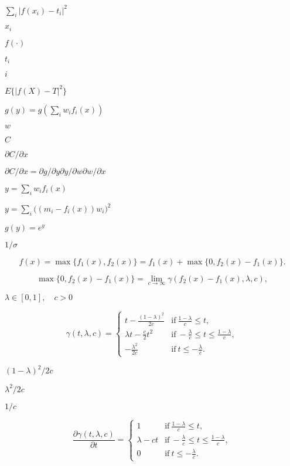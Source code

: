 \documentclass{article}
\begin{document}
$\sum_i |f(x_i)-t_i|^2$
\pagebreak

$x_i$
\pagebreak

$f(\cdot)$
\pagebreak

$t_i$
\pagebreak

$i$
\pagebreak

$E\{|f(X)-T|^2\}$
\pagebreak

$g(y) =g(\sum_i w_i f_i (x))$
\pagebreak

$w$
\pagebreak

$C$
\pagebreak

$\partial C/\partial x$
\pagebreak

$\partial C/\partial x = \partial g/\partial y \partial y/\partial w \partial w/\partial x$
\pagebreak

$y = \sum_i w_i f_i (x)$
\pagebreak

$y = \sum_i \big((m_i-f_i(x)) w_i\big)^2$
\pagebreak

$g(y) = e^y$
\pagebreak

$1/\sigma$
\pagebreak

\[ f(x) = \max \{f_1(x), f_2(x)\} = f_1(x) + \max \{0, f_2(x) - f_1(x)\}. \]
\pagebreak

\[ \max \{0, f_2(x) - f_1(x)\} = \lim_{c \rightarrow \infty} \gamma(f_2(x)-f_1(x), \lambda, c), \]
\pagebreak

$\lambda \in [0,1], \quad c>0$
\pagebreak

\[ \gamma(t,\lambda,c) = \begin{cases} t - \frac{(1-\lambda)^2}{2c} & \textrm{if}~ \frac{1-\lambda}{c} \leq t,\\ \lambda t - \frac{c}{2} t^2 & \textrm{if}~ -\frac{\lambda}{c} \leq t \leq \frac{1-\lambda}{c},\\ -\frac{\lambda^2}{2c} & \text{if}~ t \leq -\frac{\lambda}{c}. \end{cases} \]
\pagebreak

$(1-\lambda)^2/2c$
\pagebreak

$\lambda^2/2c$
\pagebreak

$1/c$
\pagebreak

\[ \frac{\partial \gamma(t,\lambda,c)}{\partial t} = \begin{cases} 1 & \textrm{if}~ \frac{1-\lambda}{c} \leq t,\\ \lambda - c t & \textrm{if}~ -\frac{\lambda}{c} \leq t \leq \frac{1-\lambda}{c},\\ 0 & \text{if}~ t \leq -\frac{\lambda}{c}. \end{cases} \]
\pagebreak
\end{document}
